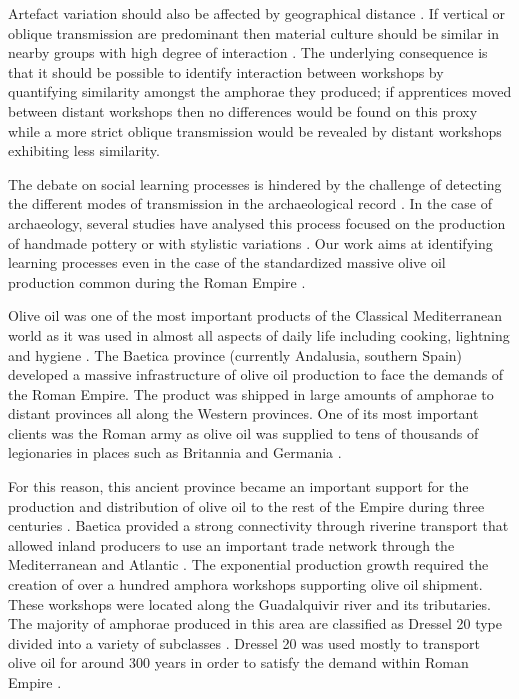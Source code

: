 \documentclass[review]{elsarticle}
\begin{document}
Artefact variation should also be affected by geographical distance \citep{bjorklund_effect_2010,shennan_isolation-by-distance_2015, van_strien_isolation-by-distance_2015}. If vertical or oblique transmission are predominant then material culture should be similar in nearby groups with high degree of interaction \citep{hart_effects_2012}. The underlying consequence is that it should be possible to identify interaction between workshops by quantifying similarity amongst the amphorae they produced; if apprentices moved between distant workshops then no differences would be found on this proxy while a more strict oblique transmission would be revealed by distant workshops exhibiting less similarity.

The debate on social learning processes is hindered by the challenge of detecting the different modes of transmission in the archaeological record \citep{roux_standardization_2015}. In the case of archaeology, several studies have analysed this process focused on the production of handmade pottery \citep{steele_james_ceramic_2010} or with stylistic variations \citep{neiman_stylistic_1995, shennan_ceramic_2001}. Our work aims at identifying learning processes even in the case of the standardized massive olive oil production common during the Roman
Empire \citep{bevan_mediterranean_2014}. 

Olive oil was one of the most important products of the Classical Mediterranean world as it was used in almost all aspects of daily life including cooking, lightning and hygiene \citep{mattingly_d.j._oil_1988}. The Baetica province (currently Andalusia, southern Spain) developed a massive infrastructure of olive oil production to face the demands of the Roman Empire. The product was shipped in large amounts of amphorae to distant provinces all along the Western provinces. One of its most important clients was the Roman army as olive oil was supplied to tens of thousands of legionaries in places such as Britannia \citep{monfort_britannia_1998,funari_economic_2005} and Germania \citep{remesal_annona_1986}. 

For this reason, this ancient province became an important support for the production and distribution of olive oil to the rest of the Empire during three centuries \citep{millet_anforas_1998, rodriguez_baetican_1998,chic2005comercio}. Baetica provided a strong connectivity through riverine transport that allowed inland producers to use an important trade network through the Mediterranean and Atlantic \citep{garcia_vargas_enrique_formal_2010}. The exponential production growth required the creation of over a hundred amphora workshops supporting olive oil shipment. These workshops were located along the Guadalquivir river and its tributaries. The majority of amphorae produced in this area are classified as Dressel 20 type divided into a variety of subclasses \citep{martin-kilcher_romischen_1994,berni_millet_epigrafianforica_2008}. Dressel 20 was used mostly to transport olive oil for around 300 years in order to satisfy the demand within Roman Empire \citep{rodriguez_economioleicola_1977}. 
\end{document}
